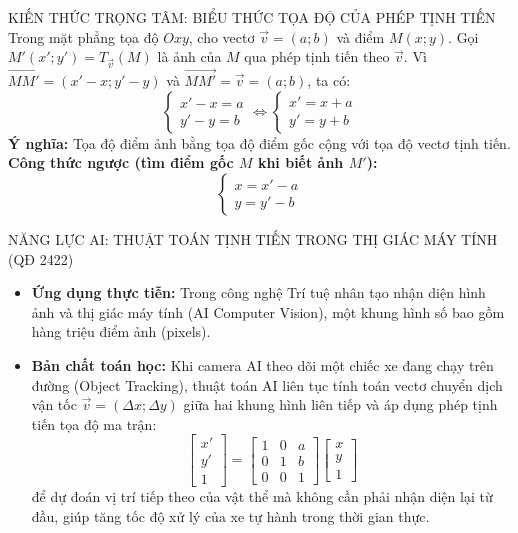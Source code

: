 \documentclass[12pt, a4paper]{article}
\renewcommand{\vec}[1]{\overrightarrow{#1}}
\begin{document}
\begin{pedabox}{KIẾN THỨC TRỌNG TÂM: BIỂU THỨC TỌA ĐỘ CỦA PHÉP TỊNH TIẾN}  
Trong mặt phẳng tọa độ $Oxy$, cho vectơ $\vec{v} = (a; b)$ và điểm $M(x; y)$.  
Gọi $M'(x'; y') = T_{\vec{v}}(M)$ là ảnh của $M$ qua phép tịnh tiến theo $\vec{v}$.  
Vì $\vec{MM'} = (x' - x; y' - y)$ và $\vec{MM'} = \vec{v} = (a; b)$, ta có:  
$$\begin{cases} x' - x = a \\ y' - y = b \end{cases} \iff \begin{cases} x' = x + a \\ y' = y + b \end{cases}$$  
\textbf{Ý nghĩa:} Tọa độ điểm ảnh bằng tọa độ điểm gốc cộng với tọa độ vectơ tịnh tiến.  
\textbf{Công thức ngược (tìm điểm gốc $M$ khi biết ảnh $M'$):}  
$$\begin{cases} x = x' - a \\ y = y' - b \end{cases}$$  
\end{pedabox}  
  
\begin{aibox}{NĂNG LỰC AI: THUẬT TOÁN TỊNH TIẾN TRONG THỊ GIÁC MÁY TÍNH (QĐ 2422)}  
\begin{itemize}[leftmargin=0.6cm]  
    \item \textbf{Ứng dụng thực tiễn:} Trong công nghệ Trí tuệ nhân tạo nhận diện hình ảnh và thị giác máy tính (AI Computer Vision), một khung hình số bao gồm hàng triệu điểm ảnh (pixels).  
    \item \textbf{Bản chất toán học:} Khi camera AI theo dõi một chiếc xe đang chạy trên đường (Object Tracking), thuật toán AI liên tục tính toán vectơ chuyển dịch vận tốc $\vec{v} = (\Delta x; \Delta y)$ giữa hai khung hình liên tiếp và áp dụng phép tịnh tiến tọa độ ma trận:  
    $$\begin{bmatrix} x' \\ y' \\ 1 \end{bmatrix} = \begin{bmatrix} 1 & 0 & a \\ 0 & 1 & b \\ 0 & 0 & 1 \end{bmatrix} \begin{bmatrix} x \\ y \\ 1 \end{bmatrix}$$  
    để dự đoán vị trí tiếp theo của vật thể mà không cần phải nhận diện lại từ đầu, giúp tăng tốc độ xử lý của xe tự hành trong thời gian thực.  
\end{itemize}  
\end{aibox}  
  
\end{document}
